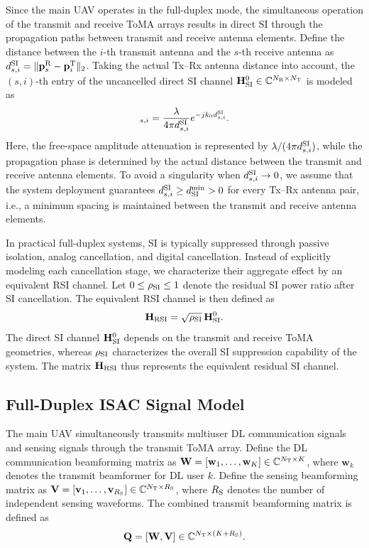 \documentclass[letterpaper,journal]{IEEEtran}
\begin{document}
Since the main UAV operates in the full-duplex mode, the simultaneous operation of the transmit and receive ToMA arrays results in direct SI through the propagation paths between transmit and receive antenna elements. Define the distance between the $i$-th transmit antenna and the $s$-th receive antenna as $d_{s,i}^{\rm SI}=\|\mathbf p_s^{\rm R}-\mathbf p_i^{\rm T}\|_2$. Taking the actual Tx--Rx antenna distance into account, the $(s,i)$-th entry of the uncancelled direct SI channel $\mathbf H_{\rm SI}^{0}\in\mathbb C^{N_{\rm R}\times N_{\rm T}}$ is modeled as
\begin{equation}
[\mathbf H_{\rm SI}^{0}]_{s,i}
=
\frac{\lambda}{4\pi d_{s,i}^{\rm SI}}
e^{-j k_0d_{s,i}^{\rm SI}}.
\label{eq:direct_si_channel}
\end{equation}
Here, the free-space amplitude attenuation is represented by $\lambda/(4\pi d_{s,i}^{\rm SI})$, while the propagation phase is determined by the actual distance between the transmit and receive antenna elements. To avoid a singularity when $d_{s,i}^{\rm SI}\rightarrow0$, we assume that the system deployment guarantees $d_{s,i}^{\rm SI}\ge d_{\rm SI}^{\min}>0$ for every Tx--Rx antenna pair, i.e., a minimum spacing is maintained between the transmit and receive antenna elements.

In practical full-duplex systems, SI is typically suppressed through passive isolation, analog cancellation, and digital cancellation. Instead of explicitly modeling each cancellation stage, we characterize their aggregate effect by an equivalent RSI channel. Let $0\le\rho_{\rm SI}\le1$ denote the residual SI power ratio after SI cancellation. The equivalent RSI channel is then defined as
\begin{equation}
\mathbf H_{\rm RSI}
=
\sqrt{\rho_{\rm SI}}\,
\mathbf H_{\rm SI}^{0}.
\label{eq:rsi_channel}
\end{equation}
The direct SI channel $\mathbf H_{\rm SI}^{0}$ depends on the transmit and receive ToMA geometries, whereas $\rho_{\rm SI}$ characterizes the overall SI suppression capability of the system. The matrix $\mathbf H_{\rm RSI}$ thus represents the equivalent residual SI channel.

\subsection{Full-Duplex ISAC Signal Model}
\label{subsec:signal_model}

The main UAV simultaneously transmits multiuser DL communication signals and sensing signals through the transmit ToMA array. Define the DL communication beamforming matrix as $\mathbf W=[\mathbf w_1,\ldots,\mathbf w_K]\in\mathbb C^{N_{\rm T}\times K}$, where $\mathbf w_k$ denotes the transmit beamformer for DL user $k$. Define the sensing beamforming matrix as $\mathbf V=[\mathbf v_1,\ldots,\mathbf v_{R_{\rm S}}]\in\mathbb C^{N_{\rm T}\times R_{\rm S}}$, where $R_{\rm S}$ denotes the number of independent sensing waveforms. The combined transmit beamforming matrix is defined as
\begin{equation}
\mathbf Q
=
[\mathbf W,\mathbf V]
\in
\mathbb C^{N_{\rm T}\times(K+R_{\rm S})}.
\label{eq:combined_beamforming}
\end{equation}
\end{document}
